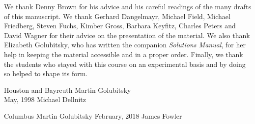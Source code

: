\documentclass{ximera}
\begin{document}
We thank Denny Brown for his advice and his careful readings of the
many drafts of this manuscript.  We thank Gerhard Dangelmayr, Michael
Field, Michael Friedberg, Steven Fuchs, Kimber Gross, Barbara Keyfitz,
Charles Peters and David Wagner for their advice on the presentation
of the material.  We also thank Elizabeth Golubitsky, who has written
the companion {\em Solutions Manual\/}, for her help in keeping the
material accessible and in a proper order.  Finally, we thank the
students who stayed with this course on an experimental basis and by
doing so helped to shape its form.

\vspace{0.1in}

\noindent Houston and Bayreuth \hfill Martin Golubitsky \\
May, 1998  \hfill Michael Dellnitz


Columbus \hfill Martin Golubitsky 
February, 2018 \hfill James Fowler
\end{document}
